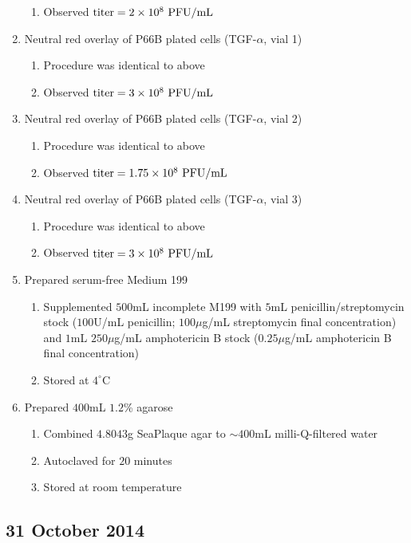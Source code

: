\begin{enumerate}
\begin{enumerate}
			\item Observed $\text{titer}=2\times 10^{8}\text{ PFU/mL}$
		\end{enumerate}
	\item Neutral red overlay of P66B plated cells (TGF-$\alpha$, vial 1)
		\begin{enumerate}
			\item Procedure was identical to above
			\item Observed $\text{titer}=3\times 10^{8}\text{ PFU/mL}$
		\end{enumerate}
	\item Neutral red overlay of P66B plated cells (TGF-$\alpha$, vial 2)
		\begin{enumerate}
			\item Procedure was identical to above
			\item Observed $\text{titer}=1.75\times 10^{8}\text{ PFU/mL}$
		\end{enumerate}
	\item Neutral red overlay of P66B plated cells (TGF-$\alpha$, vial 3)
		\begin{enumerate}
			\item Procedure was identical to above
			\item Observed $\text{titer}=3\times 10^{8}\text{ PFU/mL}$
		\end{enumerate}
	\item Prepared serum-free Medium 199
		\begin{enumerate}
			\item Supplemented $500$mL incomplete M199 with $5$mL penicillin/streptomycin stock ($100$U/mL penicillin; $100\mu$g/mL streptomycin final concentration) and $1$mL $250\mu$g/mL amphotericin B stock ($0.25\mu$g/mL amphotericin B final concentration)
			\item Stored at $4^{\circ}$C
		\end{enumerate}
	\item Prepared $400$mL $1.2$\% agarose
		\begin{enumerate}
			\item Combined $4.8043$g SeaPlaque agar to $\sim 400$mL milli-Q-filtered water
			\item Autoclaved for $20$ minutes
			\item Stored at room temperature
		\end{enumerate}
\end{enumerate}

\subsection*{31 October 2014}

